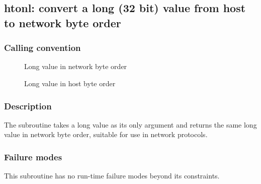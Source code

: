 \clearpage
{}
{}
\label{subr:htonl}
\subsection*{htonl: convert  a  long (32 bit)  value from host to network byte order}

\subsubsection*{Calling convention}

\begin{description}
\item[] Long value in network byte order
\item[] Long value in host byte order
\end{description}

\subsubsection*{Description}

The  subroutine takes a long value as its only
argument and returns the same long value in network byte order,
suitable for use in network protocols.

\subsubsection*{Failure modes}

This subroutine has no run-time failure modes beyond its constraints.
